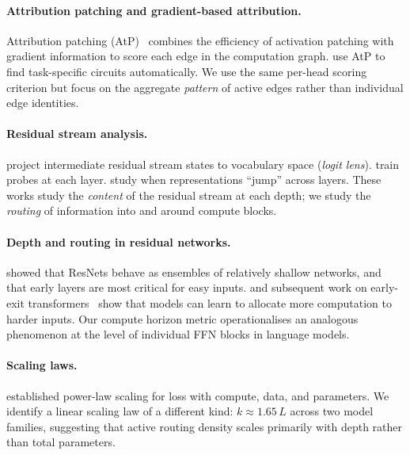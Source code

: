 \documentclass{article}
\begin{document}
\paragraph{Attribution patching and gradient-based attribution.}
Attribution patching (AtP)~\citep{nanda2023attribution} combines the
efficiency of activation patching with gradient information to score
each edge in the computation graph.
\citet{conmy2023towards} use AtP to find task-specific circuits
automatically.
We use the same per-head scoring criterion but focus on the aggregate
\emph{pattern} of active edges rather than individual edge identities.

\paragraph{Residual stream analysis.}
\citet{nostalgebraist2020logitlens} project intermediate residual stream
states to vocabulary space (\emph{logit lens}).
\citet{belrose2023eliciting} train probes at each layer.
\citet{din2023jump} study when representations ``jump'' across layers.
These works study the \emph{content} of the residual stream at each
depth; we study the \emph{routing} of information into and around
compute blocks.

\paragraph{Depth and routing in residual networks.}
\citet{veit2016residual} showed that ResNets behave as ensembles of
relatively shallow networks, and that early layers are most critical
for easy inputs.
\citet{graves2016adaptive} and subsequent work on early-exit
transformers~\citep{schuster2022confident,elbayad2020depth} show that
models can learn to allocate more computation to harder inputs.
Our compute horizon metric operationalises an analogous phenomenon
at the level of individual FFN blocks in language models.

\paragraph{Scaling laws.}
\citet{kaplan2020scaling} established power-law scaling for loss with
compute, data, and parameters.
We identify a linear scaling law of a different kind:
$k \approx 1.65\,L$ across two model families, suggesting that active
routing density scales primarily with depth rather than total parameters.


\end{document}
